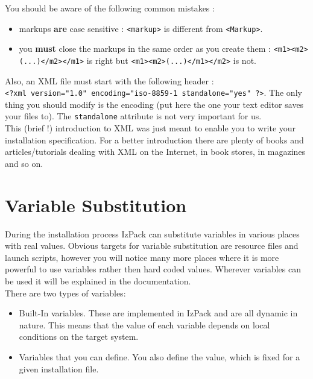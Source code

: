 You should be aware of the following common mistakes :
\begin{itemize}

  \item markups \textbf{are} case sensitive : \texttt{<markup>} is different
  from \texttt{<Markup>}.
  
  \item you \textbf{must} close the markups in the same order as you create them
  : \texttt{<m1><m2>(...)</m2></m1>} is right but 
  \texttt{<m1><m2>(...)</m1></m2>} is not.

\end{itemize}

Also, an XML file must start with the following header :\\
\texttt{<?xml version="1.0" encoding="iso-8859-1 standalone="yes" ?>}. The only
thing you should modify is the encoding (put here the one your text editor saves
your files to). The \texttt{standalone} attribute is not very important for
us.\\

This (brief !) introduction to XML was just meant to enable you to write
your installation specification. For a better introduction there are
plenty of books and articles/tutorials dealing with XML on the Internet,
in book stores, in magazines and so on.\\

\section{Variable Substitution}

During the installation process IzPack can substitute variables in
various places with real values. Obvious targets for variable
substitution are resource files and launch scripts, however you will
notice many more places where it is more powerful to use variables
rather then hard coded values. Wherever variables can be used it will
be explained in the documentation.\\

There are two types of variables:
\begin{itemize}
  \item Built-In variables. These are implemented in IzPack and are 
        all dynamic in nature. This means that the value of each
        variable depends on local conditions on the target system.
  \item Variables that you can define. You also define the value,
        which is fixed for a given installation file.
\end{itemize}

